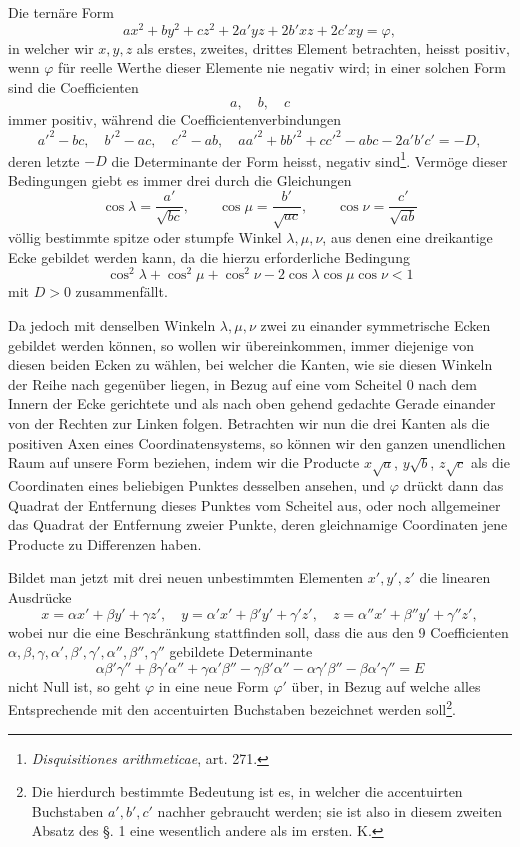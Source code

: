 \documentclass[11pt]{article}
\begin{document}
Die ternäre Form
\begin{equation}
 ax^2+by^2+cz^2+2a'yz+2b'xz+2c'xy=\varphi,
\end{equation}
in welcher wir $x,y,z$ als erstes, zweites, drittes Element betrachten, heisst positiv, wenn $\varphi$ für reelle Werthe dieser Elemente nie negativ wird; in einer solchen Form sind die Coefficienten
\[
 a,\quad b,\quad c
\]
immer positiv, während die Coefficientenverbindungen
\begin{equation}
 a'^2-bc,\quad b'^2-ac,\quad c'^2-ab,\quad aa'^2+bb'^2+cc'^2-abc-2a'b'c'=-D,
\end{equation}
deren letzte $-D$ die Determinante der Form heisst, negativ sind\footnote{\emph{Disquisitiones arithmeticae}, art. 271.}. Vermöge dieser Bedingungen giebt es immer drei durch die Gleichungen
\[
 \cos\lambda=\frac{a'}{\sqrt{bc}},\qquad
 \cos\mu=\frac{b'}{\sqrt{ac}},\qquad
 \cos\nu=\frac{c'}{\sqrt{ab}}
\]
völlig bestimmte spitze oder stumpfe Winkel $\lambda,\mu,\nu$, aus denen eine dreikantige Ecke gebildet werden kann, da die hierzu erforderliche Bedingung
\[
 \cos^2\lambda+\cos^2\mu+\cos^2\nu-2\cos\lambda\cos\mu\cos\nu<1
\]
mit $D>0$ zusammenfällt.

Da jedoch mit denselben Winkeln $\lambda,\mu,\nu$ zwei zu einander symmetrische Ecken gebildet werden können, so wollen wir übereinkommen, immer diejenige von diesen beiden Ecken zu wählen, bei welcher die Kanten, wie sie diesen Winkeln der Reihe nach gegenüber liegen, in Bezug auf eine vom Scheitel $0$ nach dem Innern der Ecke gerichtete und als nach oben gehend gedachte Gerade einander von der Rechten zur Linken folgen. Betrachten wir nun die drei Kanten als die positiven Axen eines Coordinatensystems, so können wir den ganzen unendlichen Raum auf unsere Form beziehen, indem wir die Producte $x\sqrt a$, $y\sqrt b$, $z\sqrt c$ als die Coordinaten eines beliebigen Punktes desselben ansehen, und $\varphi$ drückt dann das Quadrat der Entfernung dieses Punktes vom Scheitel aus, oder noch allgemeiner das Quadrat der Entfernung zweier Punkte, deren gleichnamige Coordinaten jene Producte zu Differenzen haben.

Bildet man jetzt mit drei neuen unbestimmten Elementen $x',y',z'$ die linearen Ausdrücke
\begin{equation}
 x=\alpha x'+\beta y'+\gamma z',\quad
 y=\alpha' x'+\beta' y'+\gamma' z',\quad
 z=\alpha'' x'+\beta'' y'+\gamma'' z',
\end{equation}
wobei nur die eine Beschränkung stattfinden soll, dass die aus den 9 Coefficienten $\alpha,\beta,\gamma,\alpha',\beta',\gamma',\alpha'',\beta'',\gamma''$ gebildete Determinante
\begin{equation}
 \alpha\beta'\gamma''+\beta\gamma'\alpha''+\gamma\alpha'\beta''-
 \gamma\beta'\alpha''-\alpha\gamma'\beta''-\beta\alpha'\gamma''=E
\end{equation}
nicht Null ist, so geht $\varphi$ in eine neue Form $\varphi'$ über, in Bezug auf welche alles Entsprechende mit den accentuirten Buchstaben bezeichnet werden soll\footnote{Die hierdurch bestimmte Bedeutung ist es, in welcher die accentuirten Buchstaben $a',b',c'$ nachher gebraucht werden; sie ist also in diesem zweiten Absatz des §. 1 eine wesentlich andere als im ersten. K.}.
\end{document}
